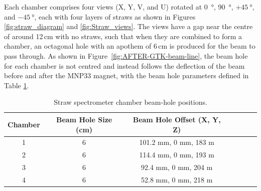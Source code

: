 \documentclass[../../main.tex]{subfiles}
\begin{document}
    Each chamber comprises four views (X, Y, V, and U) rotated at \SI{0}{\degree}, \SI{90}{\degree}, $+\SI{45}{\degree}$, and $-\SI{45}{\degree}$, each with four layers of straws as shown in Figures \ref{fig:straw_diagram} and \ref{fig:Straw_views}. The views have a gap near the centre of around 12\,cm with no straws, such that when they
    are combined to form a chamber, an octagonal hole with an apothem of 6\,cm is produced for the beam to pass through. As shown in Figure~\ref{fig:AFTER-GTK-beam-line}, the beam hole for each chamber is not centred and instead follows the deflection of the beam before and after the MNP33
    magnet, with the beam hole parameters defined in Table \ref{tab:chamber_info}.
    \begin{table}[t]
        \centering
        \begin{tabular}{ccccccc}
            \toprule
            \textbf{Chamber} & \textbf{Beam Hole Size (cm)} & \textbf{Beam Hole Offset (X, Y, Z)} \\
            \midrule
            1 & 6 & 101.2 mm, 0 mm, 183 m \\
            2 & 6 & 114.4 mm, 0 mm, 193 m \\
            3 & 6 & 92.4 mm, 0 mm, 204 m \\
            4 & 6 & 52.8 mm, 0 mm, 218 m \\
            \bottomrule
        \end{tabular}
        \linespread{1.0}
        \caption{Straw spectrometer chamber beam-hole positions.}
        \label{tab:chamber_info}
    \end{table}
    
\end{document}
